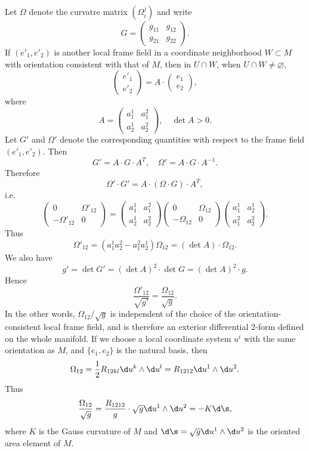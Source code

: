 \documentclass[11pt]{article}
\begin{document}
Let $\Omega$ denote the curvatre matrix $(\Omega^j_i)$ and write $$G = 
\begin{pmatrix}
    g_{11} & g_{12} \\
    g_{21} & g_{22}
\end{pmatrix}.$$ If $(e'_1, e'_2)$ is another local frame field in a coordinate neighborhood $W \subset M$ with orientation consistent with that of $M$, then in $U \cap W$, when $U \cap W \neq \varnothing$, $$\begin{pmatrix} e'_1 \\ e'_2\end{pmatrix} = A \cdot \begin{pmatrix} e_1 \\ e_2\end{pmatrix},$$ where $$A = 
\begin{pmatrix}
    a^1_1 & a^2_1 \\
    a^1_2 & a^2_2
\end{pmatrix}, \quad \det A > 0.$$ Let $G'$ and $\Omega'$ denote the corresponding quantities with respect to the frame field $(e'_1, e'_2)$. Then $$G' = A \cdot G \cdot A^T, \quad \Omega' = A \cdot G \cdot A^{-1}.$$ Therefore $$\Omega' \cdot G' = A \cdot (\Omega \cdot G) \cdot A^T,$$ i.e. $$\begin{pmatrix}
    0 & \Omega'_{12} \\
    -\Omega'_{12} & 0
\end{pmatrix} = \begin{pmatrix}
    a^1_1 & a^2_1 \\
    a^1_2 & a^2_2
\end{pmatrix}\begin{pmatrix}
    0 & \Omega_{12} \\
    -\Omega_{12} & 0
\end{pmatrix}\begin{pmatrix}
    a^1_1 & a^1_2 \\
    a^2_1 & a^2_2
\end{pmatrix}.$$
Thus $$\Omega'_{12} = (a^1_1a^2_2 - a^2_1a^1_2) \Omega_{12} = (\det A) \cdot \Omega_{12}.$$ We also have $$g' = \det G' = (\det A)^2 \cdot \det G = (\det A)^2 \cdot g.$$ Hence $$\frac{\Omega'_{12}}{\sqrt{g'}} = \frac{\Omega_{12}}{\sqrt{g}}.$$ In the other words, $\Omega_{12}/\sqrt{g}$ is independent of the choice of the orientation-consistent local frame field, and is therefore an exterior differential 2-form defined on the whole manifold. If we choose a local coordinate system $u^i$ with the same orientation as $M$, and $\{e_1, e_2\}$ is the natural basis, then $$\Omega_{12} = \frac{1}{2}R_{12kl}\d u^k \wedge \d u^l = R_{1212}\d u^1 \wedge \d u^2.$$ Thus $$\frac{\Omega_{12}}{\sqrt{g}} = \frac{R_{1212}}{g} \cdot \sqrt{g} \d u^1 \wedge \d u^2 = -K\d\s,$$ where $K$ is the Gauss curvature of $M$ and $\d\s = \sqrt{g}\d u^1 \wedge \d u^2$ is the oriented area element of $M$.
\end{document}
